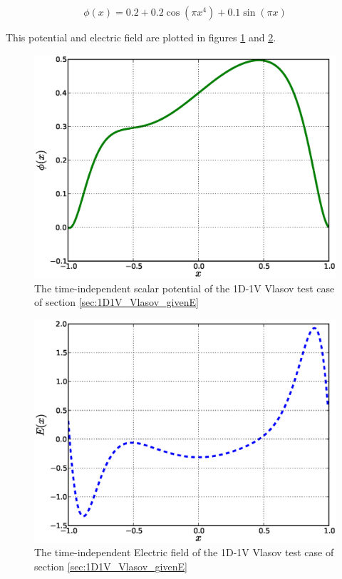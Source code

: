 \documentclass[11pt,titlepage]{report}
\begin{document}
\begin{equation}
\phi(x) = 0.2 + 0.2\cos(\pi x^4) + 0.1\sin(\pi x)
\end{equation}

\noindent This potential and electric field are plotted in figures \ref{fig:1D1V_Vlasov_phi} and \ref{fig:1D1V_Vlasov_E}.


\begin{figure}[h!]
  \centering
    \includegraphics[scale = 0.45]{graphics/phi}
  \caption{The time-independent scalar potential of the 1D-1V Vlasov test case of section \ref{sec:1D1V_Vlasov_givenE}}
  \label{fig:1D1V_Vlasov_phi}
\end{figure}


\begin{figure}[h!]
  \centering
    \includegraphics[scale = 0.45]{graphics/E}
  \caption{The time-independent Electric field of the 1D-1V Vlasov test case of section \ref{sec:1D1V_Vlasov_givenE}}
  \label{fig:1D1V_Vlasov_E}
\end{figure}
\end{document}
